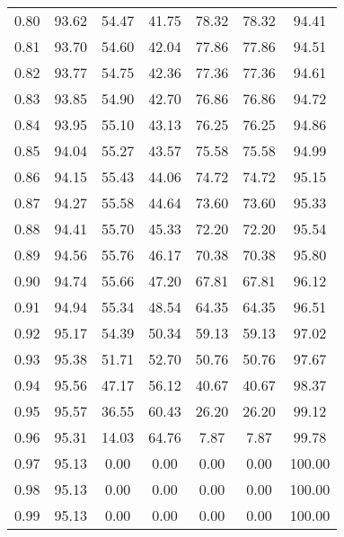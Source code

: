 \begin{tabular}{|c|c|c|c|c|c|c|}
      0.80 &     93.62 &     54.47 &      41.75 &   78.32 &      78.32 &         94.41 \\
      0.81 &     93.70 &     54.60 &      42.04 &   77.86 &      77.86 &         94.51 \\
      0.82 &     93.77 &     54.75 &      42.36 &   77.36 &      77.36 &         94.61 \\
      0.83 &     93.85 &     54.90 &      42.70 &   76.86 &      76.86 &         94.72 \\
      0.84 &     93.95 &     55.10 &      43.13 &   76.25 &      76.25 &         94.86 \\
      0.85 &     94.04 &     55.27 &      43.57 &   75.58 &      75.58 &         94.99 \\
      0.86 &     94.15 &     55.43 &      44.06 &   74.72 &      74.72 &         95.15 \\
      0.87 &     94.27 &     55.58 &      44.64 &   73.60 &      73.60 &         95.33 \\
      0.88 &     94.41 &     55.70 &      45.33 &   72.20 &      72.20 &         95.54 \\
      0.89 &     94.56 &     55.76 &      46.17 &   70.38 &      70.38 &         95.80 \\
      0.90 &     94.74 &     55.66 &      47.20 &   67.81 &      67.81 &         96.12 \\
      0.91 &     94.94 &     55.34 &      48.54 &   64.35 &      64.35 &         96.51 \\
      0.92 &     95.17 &     54.39 &      50.34 &   59.13 &      59.13 &         97.02 \\
      0.93 &     95.38 &     51.71 &      52.70 &   50.76 &      50.76 &         97.67 \\
      0.94 &     95.56 &     47.17 &      56.12 &   40.67 &      40.67 &         98.37 \\
      0.95 &     95.57 &     36.55 &      60.43 &   26.20 &      26.20 &         99.12 \\
      0.96 &     95.31 &     14.03 &      64.76 &    7.87 &       7.87 &         99.78 \\
      0.97 &     95.13 &      0.00 &       0.00 &    0.00 &       0.00 &        100.00 \\
      0.98 &     95.13 &      0.00 &       0.00 &    0.00 &       0.00 &        100.00 \\
      0.99 &     95.13 &      0.00 &       0.00 &    0.00 &       0.00 &        100.00 \\
\bottomrule
\end{tabular}
